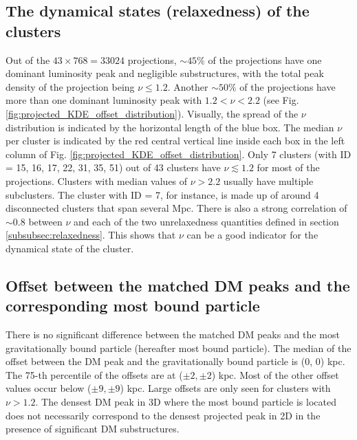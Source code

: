 \subsection{The dynamical states (relaxedness) of the clusters}
Out of the $43 \times 768 = 33 024$ projections, $\sim 45\%$ of the projections 
have one dominant luminosity peak and negligible substructures, with the total peak density of the
projection being $\nu \leq 1.2$. 
Another $\sim 50\%$ of the projections have more than one dominant luminosity
peak with $1.2 < \nu < 2.2$ (see Fig.
\ref{fig:projected_KDE_offset_distribution}).
Visually, the spread of the $\nu$ distribution is indicated by the horizontal 
length of the blue box. 
The median $\nu$ per cluster is indicated by the red central vertical line
inside each box in the left column of Fig. 
\ref{fig:projected_KDE_offset_distribution}.
Only 7 clusters (with ID = 15, 16, 17, 22, 31, 35, 51) out of 43 clusters have $\nu
\lesssim 1.2$ for most of the projections.
Clusters with median values of $\nu > 2.2$ usually have multiple subclusters.
The cluster with ID = 7, for instance, is made up of around 4 disconnected clusters that span
several Mpc.  
There is also a strong correlation of $\sim 0.8$ between $\nu$ and 
each of the two unrelaxedness quantities defined in section 
\ref{subsubsec:relaxedness}. 
This shows that $\nu$ can be a good indicator for the dynamical state of the
cluster.


\subsection{Offset between the matched DM peaks and the corresponding most
bound particle}
\label{subsec:offset_from_most_bound_particle}
There is no significant difference between the matched DM peaks and 
the most gravitationally 
bound particle (hereafter most bound particle).
The median of the offset between the DM peak and the gravitationally bound
particle is (0, 0) kpc. The 75-th percentile of the offsets are at ($\pm2,\pm2$) kpc. 
Most of the other offset values occur below ($\pm 9, \pm 9$) kpc. Large offsets
are only seen for clusters with $\nu > 1.2$. The densest DM peak in 3D where
the most bound particle is located does not
necessarily correspond to the densest projected peak in 2D in the presence of 
significant DM substructures.   

